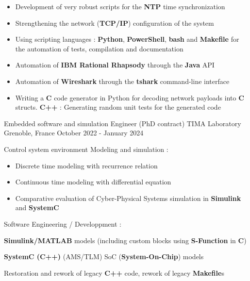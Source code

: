 \begin{cventries}
{\begin{cvitems}
{			\begin{itemize}
				\item{Development of very robust scripts for the \textbf{NTP} time synchronization}
				\item{Strengthening the network (\textbf{TCP/IP}) configuration of the system}
				\item{Using scripting languages : \textbf{Python}, \textbf{PowerShell}, \textbf{bash} and \textbf{Makefile} for the automation of tests, compilation and documentation}
				\item{Automation of \textbf{IBM Rational Rhapsody} through  the \textbf{Java} API}
				\item{Automation of \textbf{Wireshark} through the \textbf{tshark} command-line interface}
				\item{Writing a \textbf{C} code generator in Python for decoding network payloads into \textbf{C} structs. \textbf{C++} : Generating random unit tests for the generated code}	
			\end{itemize}
		}
		\end{cvitems}
	}

	\cventry
	{Embedded software and simulation Engineer (PhD contract)} %
	{TIMA Laboratory} %
	{Grenoble, France} %
	{October 2022 - January 2024} %
	{
		\begin{cvitems} %
		\item{
			Control system environment Modeling and simulation :
			\begin{itemize}
				\item{Discrete time modeling with recurrence relation}
				\item{Continuous time modeling with differential equation}
				\item{Comparative evaluation of Cyber-Physical Systems simulation in \textbf{Simulink} and \textbf{SystemC}}
			\end{itemize}
		}
		\item{
			Software Engineering / Developpment :
			\begin{itemize}
				\item{\textbf{Simulink/MATLAB} models (including custom blocks using \textbf{S-Function} in \textbf{C})
				\item{\textbf{SystemC (C++)} (AMS/TLM) SoC (\textbf{System-On-Chip}) models}}
				\item{Restoration and rework of legacy \textbf{C++} code, rework of legacy \textbf{Makefile}s}
			\end{itemize}
		}
		\end{cvitems}
	}


\end{cventries}
